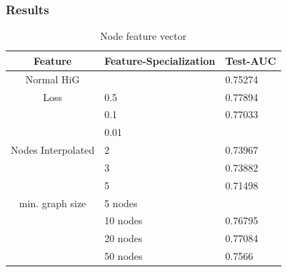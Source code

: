 \subsubsection{Results}

\begin{table}[ht!]
    \centering
    \caption{Node feature vector}
    \label{node_features}
    \begin{tabular}{c || l| p{6cm} |}
        Feature            & Feature-Specialization & Test-AUC \\
        \hline
        \hline
        Normal HiG         &                        & 0.75274  \\
        \hline
        Loss               & 0.5                    & 0.77894  \\
                           & 0.1                    & 0.77033  \\
                           & 0.01                   &          \\
        \hline
        Nodes Interpolated & 2                      & 0.73967  \\
                           & 3                      & 0.73882  \\
                           & 5                      & 0.71498  \\
        \hline
        min. graph size    & 5 nodes                &          \\
                           & 10 nodes               & 0.76795  \\
                           & 20 nodes               & 0.77084  \\
                           & 50 nodes               & 0.7566   \\
    \end{tabular}
\end{table}
